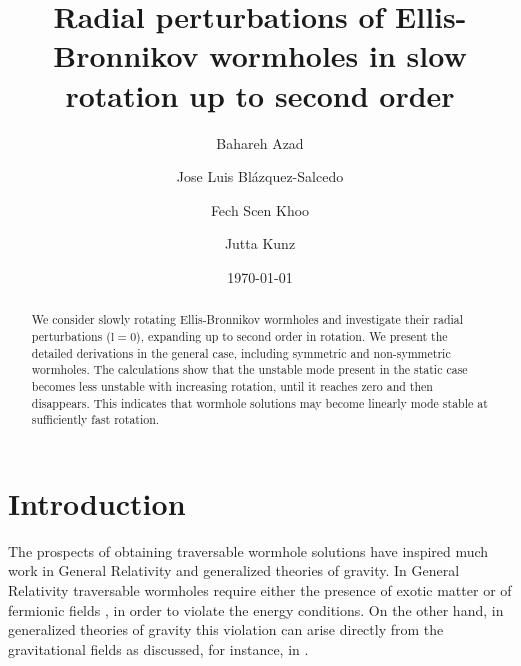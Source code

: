 \documentclass[aps,prd,12pt,superscriptaddress]{revtex4-2}
\begin{document}
\title{Radial perturbations of Ellis-Bronnikov wormholes in slow rotation up to second order}

\author{Bahareh Azad}
%
\author{Jose Luis Bl\'azquez-Salcedo}
%
\author{Fech Scen Khoo}
%
\author{Jutta Kunz}



\begin{abstract} 
We consider slowly rotating Ellis-Bronnikov wormholes and investigate their radial perturbations ($\mathrm{l}=0$), expanding up to second order in rotation.
We present the detailed derivations in the general case, including symmetric and non-symmetric wormholes.
The calculations show that the unstable mode present in the static case becomes less unstable with increasing rotation, until it reaches zero and then disappears.
This indicates that wormhole solutions may become linearly mode stable at sufficiently fast rotation.
\end{abstract}


\date{\today}

\maketitle

\newpage




\section{Introduction}

The prospects of obtaining traversable wormhole solutions have inspired much work in General Relativity and generalized theories of gravity.
In General Relativity traversable wormholes require either the presence of exotic matter \cite{Ellis:1973yv,Ellis:1979bh,Bronnikov:1973fh,Morris:1988tu,Morris:1988cz,Visser:1995cc} or of fermionic fields \cite{Blazquez-Salcedo:2020czn,Konoplya:2021hsm}, in order to violate the energy conditions.
On the other hand, in generalized theories of gravity this violation can arise directly from the gravitational fields as discussed, for instance, in \cite{Kanti:2011jz,Alcubierre:2017pqm}.
\end{document}
